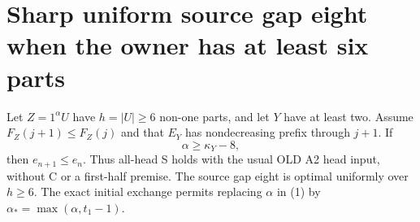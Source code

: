 \section{Sharp uniform source gap eight when the owner has at least six parts}
\begin{theorem}
Let $Z=1^\alpha U$ have $h=|U|\ge6$ non-one parts, and let $Y$
have at least two. Assume $F_Z(j+1)\le F_Z(j)$ and that $E_Y$
has nondecreasing prefix through $j+1$. If
\[
                         \alpha\ge\kappa_Y-8,         \tag{1}
\]
then $e_{n+1}\le e_n$. Thus all-head S holds with the usual
OLD A2 head input, without C or a first-half premise.
The source gap eight is optimal uniformly over $h\ge6$.
The exact initial exchange permits replacing $\alpha$ in (1)
by $\alpha_* =\max(\alpha,t_1-1)$.
\end{theorem}
